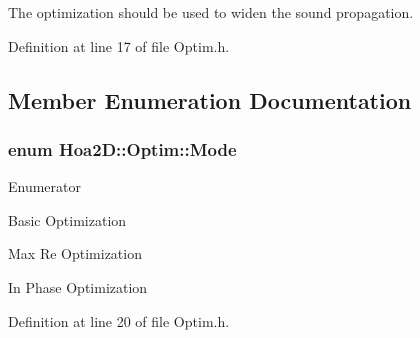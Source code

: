 The optimization should be used to widen the sound propagation. 

Definition at line 17 of file Optim.\-h.



\subsection{Member Enumeration Documentation}
\hypertarget{class_hoa2_d_1_1_optim_ae40f22368cb55699cf19729e37c0aff3}{
\subsubsection[{Mode}]{\setlength{\rightskip}{0pt plus 5cm}enum {\bf Hoa2\-D\-::\-Optim\-::\-Mode}}}\label{class_hoa2_d_1_1_optim_ae40f22368cb55699cf19729e37c0aff3}
\begin{Desc}
\item[Enumerator]\par
\begin{description}
\item[{\em 
\hypertarget{class_hoa2_d_1_1_optim_ae40f22368cb55699cf19729e37c0aff3af5bbb98a42968855f2f43d9a708ae8d2}{Basic}\label{class_hoa2_d_1_1_optim_ae40f22368cb55699cf19729e37c0aff3af5bbb98a42968855f2f43d9a708ae8d2}
}]Basic Optimization \item[{\em 
\hypertarget{class_hoa2_d_1_1_optim_ae40f22368cb55699cf19729e37c0aff3a6b8b2446e2cffae18f5f4625b68e0f21}{Max\-Re}\label{class_hoa2_d_1_1_optim_ae40f22368cb55699cf19729e37c0aff3a6b8b2446e2cffae18f5f4625b68e0f21}
}]Max Re Optimization \item[{\em 
\hypertarget{class_hoa2_d_1_1_optim_ae40f22368cb55699cf19729e37c0aff3a7cbed6ffe52c3bd78de0fafc03a6bbb7}{in\-Phase}\label{class_hoa2_d_1_1_optim_ae40f22368cb55699cf19729e37c0aff3a7cbed6ffe52c3bd78de0fafc03a6bbb7}
}]In Phase Optimization \end{description}
\end{Desc}


Definition at line 20 of file Optim.\-h.



